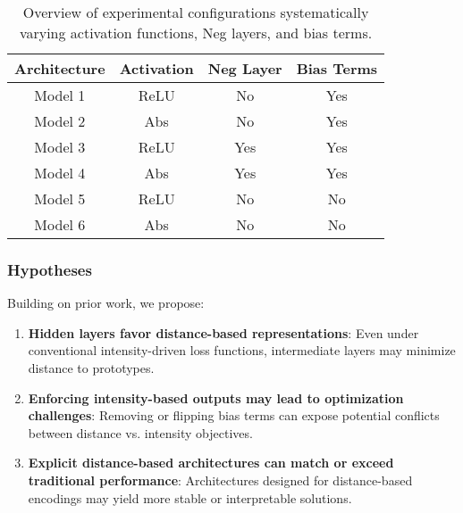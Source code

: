 \begin{table}[ht]
\centering
\begin{tabular}{|c|c|c|c|}
\hline
\textbf{Architecture} & \textbf{Activation} & \textbf{Neg Layer} & \textbf{Bias Terms} \\
\hline
Model 1 & ReLU & No & Yes \\
Model 2 & Abs & No & Yes \\
Model 3 & ReLU & Yes & Yes \\
Model 4 & Abs & Yes & Yes \\
Model 5 & ReLU & No & No \\
Model 6 & Abs & No & No \\
\hline
\end{tabular}
\caption{Overview of experimental configurations systematically varying activation functions, Neg layers, and bias terms.}
\label{tab:architectures}
\end{table}

\subsubsection{Hypotheses}
Building on prior work, we propose:
\begin{enumerate}
    \item \textbf{Hidden layers favor distance-based representations}: Even under conventional intensity-driven loss functions, intermediate layers may minimize distance to prototypes.
    \item \textbf{Enforcing intensity-based outputs may lead to optimization challenges}: Removing or flipping bias terms can expose potential conflicts between distance vs. intensity objectives.
    \item \textbf{Explicit distance-based architectures can match or exceed traditional performance}: Architectures designed for distance-based encodings may yield more stable or interpretable solutions.
\end{enumerate}

